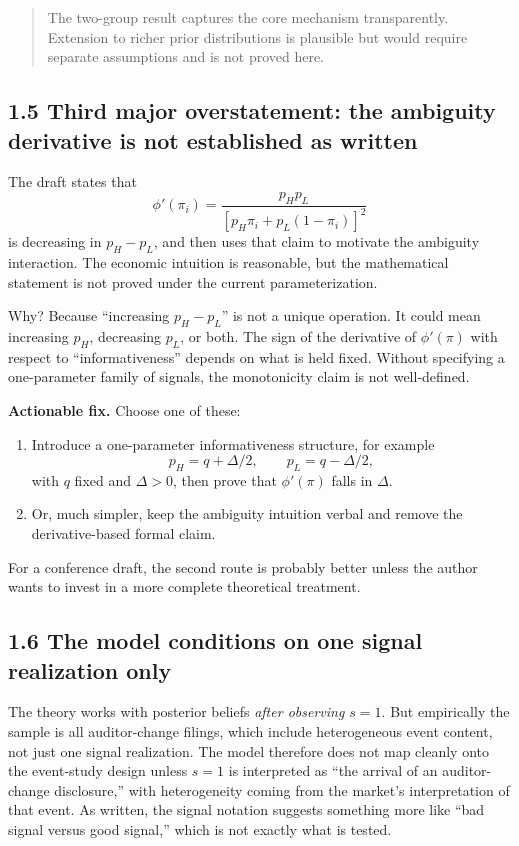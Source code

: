 \documentclass[11pt]{article}
\begin{document}
\begin{quote}
The two-group result captures the core mechanism transparently. Extension to richer prior distributions is plausible but would require separate assumptions and is not proved here.
\end{quote}

\subsection*{1.5 Third major overstatement: the ambiguity derivative is not established as written}

The draft states that
\[
\phi'(\pi_i)=\frac{p_Hp_L}{\left[p_H\pi_i+p_L(1-\pi_i)\right]^2}
\]
is decreasing in $p_H-p_L$, and then uses that claim to motivate the ambiguity interaction. The economic intuition is reasonable, but the mathematical statement is not proved under the current parameterization.

Why? Because ``increasing $p_H-p_L$'' is not a unique operation. It could mean increasing $p_H$, decreasing $p_L$, or both. The sign of the derivative of $\phi'(\pi)$ with respect to ``informativeness'' depends on what is held fixed. Without specifying a one-parameter family of signals, the monotonicity claim is not well-defined.

\textbf{Actionable fix.} Choose one of these:

\begin{enumerate}[leftmargin=1.5em]
    \item Introduce a one-parameter informativeness structure, for example
    \[
    p_H=q+\Delta/2,\qquad p_L=q-\Delta/2,
    \]
    with $q$ fixed and $\Delta>0$, then prove that $\phi'(\pi)$ falls in $\Delta$.
    \item Or, much simpler, keep the ambiguity intuition verbal and remove the derivative-based formal claim.
\end{enumerate}

For a conference draft, the second route is probably better unless the author wants to invest in a more complete theoretical treatment.

\subsection*{1.6 The model conditions on one signal realization only}

The theory works with posterior beliefs \emph{after observing $s=1$}. But empirically the sample is all auditor-change filings, which include heterogeneous event content, not just one signal realization. The model therefore does not map cleanly onto the event-study design unless $s=1$ is interpreted as ``the arrival of an auditor-change disclosure,'' with heterogeneity coming from the market's interpretation of that event. As written, the signal notation suggests something more like ``bad signal versus good signal,'' which is not exactly what is tested.
\end{document}
